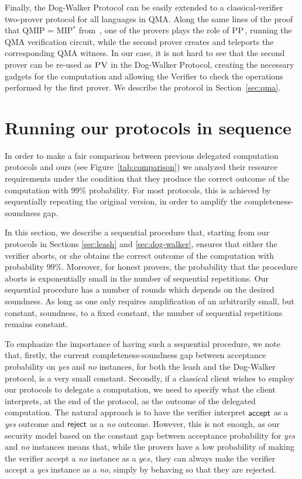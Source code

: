 Finally, the Dog-Walker Protocol can be easily extended to a classical-verifier  two-prover protocol for all languages in QMA. 
Along the same lines of the proof that QMIP = MIP$^*$ from~\cite{reichardt2012classical}, one of the provers plays the role of $\textsc{PP}$, running the  QMA verification circuit, while the second prover creates and teleports the corresponding QMA witness. In our case, it is not hard to see that the second prover can be  re-used as $\textsc{PV}$ in the Dog-Walker Protocol, creating the necessary gadgets for the computation and allowing the Verifier to check the operations performed by the first prover.  We describe the protocol in Section~\ref{sec:qma}.




\section{Running our protocols in sequence}
\label{sec:sequential}

In order to make a fair comparison between previous delegated computation protocols and ours (see Figure~\ref{tab:comparison}) we analyzed their resource requirements under the condition that they produce the correct outcome of the computation with $99\%$ probability. For most protocols, this is achieved by sequentially repeating the original version, in order to amplify the completeness-soundness gap. 

In this section, we describe a sequential procedure that, starting from our protocols in Sections \ref{sec:leash} and \ref{sec:dog-walker}, ensures that either the verifier aborts, or she obtains the correct outcome of the computation with probability $99\%$. Moreover, for honest provers, the probability that the procedure aborts is exponentially small in the number of sequential repetitions. Our sequential procedure has a number of rounds which depends on the desired soundness. As long as one only requires amplification of an arbitrarily small, but constant, soundness, to a fixed constant, the number of sequential repetitions remains constant.

To emphasize the importance of having such a sequential procedure, we note that, firstly, the current completeness-soundness gap between acceptance probability on \textit{yes} and \textit{no} instances, for both the leash and the Dog-Walker protocol, is a very small constant. Secondly, if a classical client wishes to employ our protocols to delegate a computation, we need to specify what the client interprets, at the end of the protocol, as the outcome of the delegated computation. The natural approach is to have the verifier interpret $\sf accept$ as a \textit{yes} outcome and $\sf reject$ as a \textit{no} outcome. However, this is not enough, as our security model based on the constant gap between acceptance probability for \textit{yes} and \textit{no} instances means that, while the provers have a low probability of making the verifier accept a \textit{no} instance as a $\textit{yes}$, they can always make the verifier accept a \textit{yes} instance as a \textit{no}, simply by behaving so that they are rejected.

